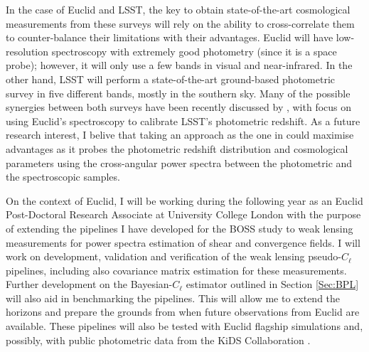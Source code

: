 \qquad In the case of Euclid and LSST, the key to obtain state-of-the-art cosmological measurements from these surveys will rely on the ability to cross-correlate them to counter-balance their limitations with their advantages. Euclid will have low-resolution spectroscopy with extremely good photometry (since it is a space probe); however, it will only use a few bands in visual and near-infrared. In the other hand, LSST will perform a state-of-the-art ground-based photometric survey in five different bands, mostly in the southern sky. Many of the possible synergies between both surveys have been recently discussed by \cite{2017EuclidLSST}, with focus on using Euclid's spectroscopy to calibrate LSST's photometric redshift. As a future research interest, I belive that taking an approach as the one in \cite{2016McLeod} could maximise advantages as it probes the photometric redshift distribution and cosmological parameters using the cross-angular power spectra between the photometric and the spectroscopic samples. 

\qquad On the context of Euclid, I will be working during the following year as an Euclid Post-Doctoral Research Associate at University College London with the purpose of extending the pipelines I have developed for the BOSS study to weak lensing measurements for power spectra estimation of shear and convergence fields. I will work on development, validation and verification of the weak lensing pseudo-$C_{\ell}$ pipelines, including also covariance matrix estimation for these measurements. Further development on the Bayesian-$C_{\ell}$ estimator outlined in Section \ref{Sec:BPL} will also aid in benchmarking the pipelines. This will allow me to extend the horizons and prepare the grounds from when future observations from Euclid are available. These pipelines will also be tested with Euclid flagship simulations and, possibly, with public photometric data from the KiDS Collaboration \citep{2017KiDS-DR3}.

